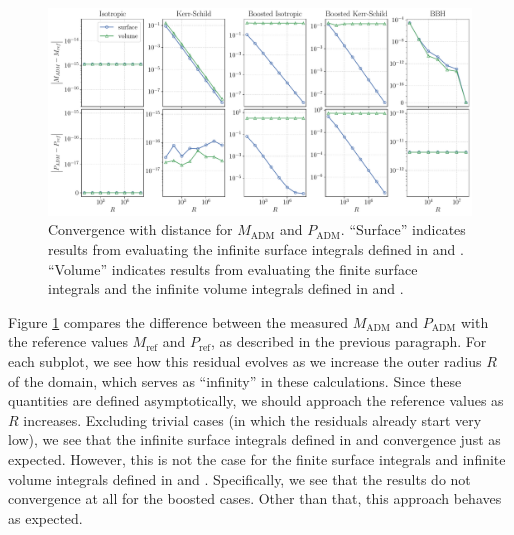 \documentclass{../document}
\begin{document}
      \begin{figure}
        \centering
        \includegraphics[width=\textwidth]{../../plots/final_report/distance_convergence_Madm_Padm.pdf}
        \caption{Convergence with distance for $M_\text{ADM}$ and $P_\text{ADM}$. ``Surface'' indicates results from evaluating the infinite surface integrals defined in \eq{\eqref{eq:Madm-surf}} and \eq{\eqref{eq:Padm-surf}}. ``Volume'' indicates results from evaluating the finite surface integrals and the infinite volume integrals defined in \eq{\eqref{eq:Madm-mixed}} and \eq{\eqref{eq:Padm-mixed}}.}
        \label{fig:distance_convergence_Madm_Padm}
      \end{figure}

      Figure \ref{fig:distance_convergence_Madm_Padm} compares the difference between the measured $M_\text{ADM}$ and $P_\text{ADM}$ with the reference values $M_\text{ref}$ and $P_\text{ref}$, as described in the previous paragraph. For each subplot, we see how this residual evolves as we increase the outer radius $R$ of the domain, which serves as ``infinity'' in these calculations. Since these quantities are defined asymptotically, we should approach the reference values as $R$ increases. Excluding trivial cases (in which the residuals already start very low), we see that the infinite surface integrals defined in \eq{\eqref{eq:Madm-surf}} and \eq{\eqref{eq:Padm-surf}} convergence just as expected. However, this is not the case for the finite surface integrals and infinite volume integrals defined in \eq{\eqref{eq:Madm-mixed}} and \eq{\eqref{eq:Padm-mixed}}. Specifically, we see that the results do not convergence at all for the boosted cases.  Other than that, this approach behaves as expected.
\end{document}
